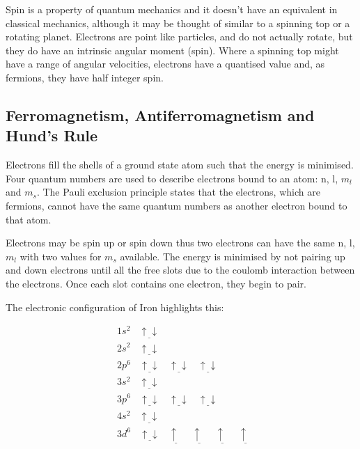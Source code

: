 Spin is a property of quantum mechanics and it doesn't have an equivalent in classical mechanics, although it may be thought of similar to a spinning top or a rotating planet.  Electrons are point like particles, and do not actually rotate, but they do have an intrinsic angular moment (spin).  Where a spinning top might have a range of angular velocities, electrons have a quantised value and, as fermions, they have half integer spin.  


\subsection{Ferromagnetism, Antiferromagnetism and Hund's Rule}
\label{section:hundsrule}

Electrons fill the shells of a ground state atom such that the energy is minimised.  Four quantum numbers are used to describe electrons bound to an atom: n, l, $m_l$ and $m_s$.  The Pauli exclusion principle states that the electrons, which are fermions, cannot have the same quantum numbers as another electron bound to that atom.

Electrons may be spin up or spin down thus two electrons can have the same n, l, $m_l$ with two values for $m_s$ available.  The energy is minimised by not pairing up and down electrons until all the free slots due to the coulomb interaction between the electrons.  Once each slot contains one electron, they begin to pair.

The electronic configuration of Iron highlights this:

\begin{equation}
\begin{split}
&1s^2 \:\:\:\: \underline{\uparrow \downarrow} \\
&2s^2 \:\:\:\: \underline{\uparrow \downarrow} \\
&2p^6 \:\:\:\: \underline{\uparrow \downarrow} \:\:\:\:  \underline{\uparrow  \downarrow} \:\:\:\:  \underline{\uparrow  \downarrow} \\
&3s^2 \:\:\:\: \underline{\uparrow \downarrow} \\
&3p^6 \:\:\:\: \underline{\uparrow \downarrow} \:\:\:\:  \underline{\uparrow \downarrow} \:\:\:\:  \underline{\uparrow \downarrow} \\
&4s^2 \:\:\:\: \underline{\uparrow \downarrow} \\
&3d^6 \:\:\:\: \underline{\uparrow \downarrow} \:\:\:\:  \underline{\uparrow \:\:} \:\:\:\:  \underline{\uparrow \:\:} \:\:\:\: \underline{\uparrow \:\:} \:\:\:\: \underline{\uparrow \:\:}\\
\end{split}
\label{eq:fullironconfiguration}
\end{equation}

